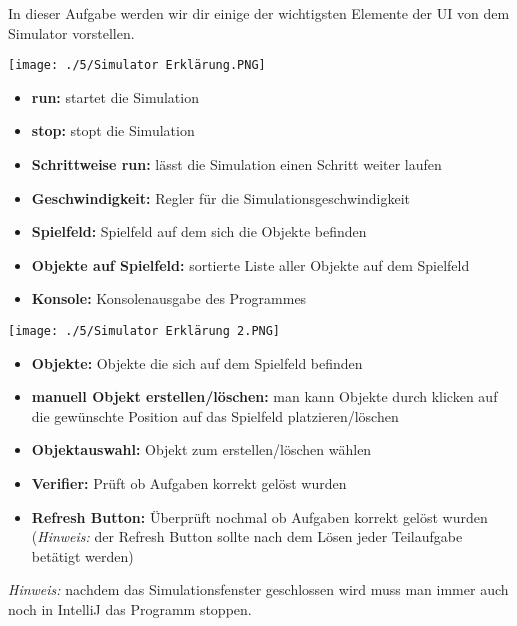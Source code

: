 
In dieser Aufgabe werden wir dir einige der wichtigsten Elemente der UI von dem Simulator vorstellen.
\begin{center}
    \texttt{[image: ./5/Simulator Erklärung.PNG]}
\end{center}
\begin{itemize}
    \item \textbf{run:} startet die Simulation
    \item \textbf{stop:} stopt die Simulation
    \item \textbf{Schrittweise run:} lässt die Simulation einen Schritt weiter laufen
    \item \textbf{Geschwindigkeit:} Regler für die Simulationsgeschwindigkeit
    \item \textbf{Spielfeld:} Spielfeld auf dem sich die Objekte befinden
    \item \textbf{Objekte auf Spielfeld:} sortierte Liste aller Objekte auf dem Spielfeld
    \item \textbf{Konsole:} Konsolenausgabe des Programmes
\end{itemize}
\newpage
\begin{center}
    \texttt{[image: ./5/Simulator Erklärung 2.PNG]}
\end{center}
\begin{itemize}
    \item \textbf{Objekte:} Objekte die sich auf dem Spielfeld befinden
    \item \textbf{manuell Objekt erstellen/löschen:} man kann Objekte durch klicken auf die gewünschte Position auf das Spielfeld platzieren/löschen
    \item \textbf{Objektauswahl:} Objekt zum erstellen/löschen wählen
    \item \textbf{Verifier:} Prüft ob Aufgaben korrekt gelöst wurden
    \item \textbf{Refresh Button:} Überprüft nochmal ob Aufgaben korrekt gelöst wurden (\textit{Hinweis:} der Refresh Button sollte nach dem Lösen jeder Teilaufgabe betätigt werden)
\end{itemize}
\textit{Hinweis:} nachdem das Simulationsfenster geschlossen wird muss man immer auch noch in IntelliJ das Programm stoppen.
